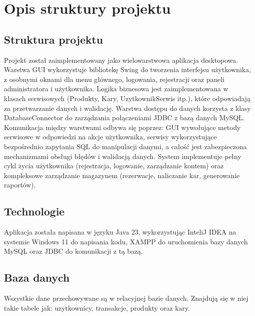 \chapter{Opis struktury projektu}
\label{chap:Opis struktury projektu}

\section{Struktura projektu}
\label{sec:Struktura projektu}
Projekt został zaimplementowany jako wielowarstwowa aplikacja desktopowa. Warstwa GUI wykorzystuje bibliotekę Swing do tworzenia interfejsu użytkownika, z osobnymi oknami dla menu głównego, logowania, rejestracji oraz paneli administratora i użytkownika. Logika biznesowa jest zaimplementowana w klasach serwisowych (Produkty, Kary, UzytkownikSerwis itp.), które odpowiadają za przetwarzanie danych i walidację. Warstwa dostępu do danych korzysta z klasy DatabaseConnector do zarządzania połączeniami JDBC z bazą danych MySQL. Komunikacja między warstwami odbywa się poprzez: GUI wywołujące metody serwisowe w odpowiedzi na akcje użytkownika, serwisy wykorzystujące bezpośrednio zapytania SQL do manipulacji danymi, a całość jest zabezpieczona mechanizmami obsługi błędów i walidacją danych. System implementuje pełny cykl życia użytkownika (rejestracja, logowanie, zarządzanie kontem) oraz kompleksowe zarządzanie magazynem (rezerwacje, naliczanie kar, generowanie raportów).

\section{Technologie}
\label{sec:Technologie}
Aplikacja została napisana w języku Java 23, wykorzystując InteliJ IDEA na systemie Windows 11 do napisania kodu, XAMPP do uruchomienia bazy danych MySQL oraz JDBC do komunikacji z tą bazą.

\section{Baza danych}
\label{sec:Baza danych}
Wszystkie dane przechowywane są w relacyjnej bazie danych. Znajdują się w niej takie tabele jak: uzytkownicy, transakcje, produkty oraz kary.

